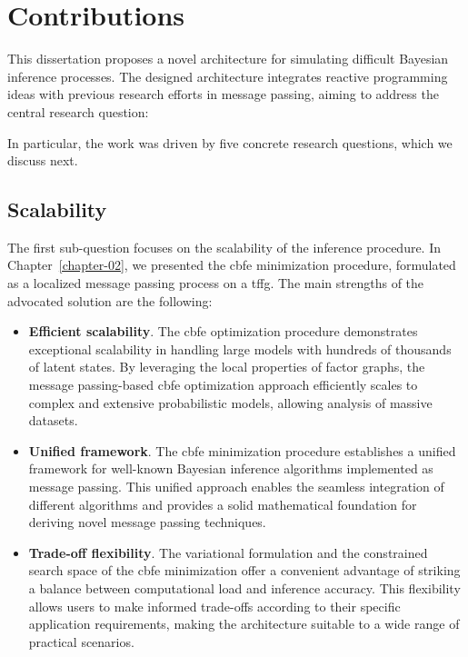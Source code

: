 \section{Contributions}\label{chapter-06:section:contributions}

This dissertation proposes a novel architecture for simulating difficult Bayesian inference processes.
The designed architecture integrates reactive programming ideas with previous research efforts
in message passing, aiming to address the central research question:

\begin{rqbox}
  \mainquestion
\end{rqbox}

In particular, the work was driven by five concrete research questions, which we discuss next.

\subsection{Scalability}

\begin{questions}
  \item \scalabilityquestion \label{question:contributions:scalability}
\end{questions}

The first sub-question focuses on the scalability of the inference procedure.
In Chapter~\ref{chapter-02}, we presented the \ac{cbfe} minimization procedure, formulated as a localized message passing process on a \ac{tffg}. The main strengths of the advocated solution are the following:
\begin{itemize}
  \item \textbf{Efficient scalability}. The \ac{cbfe} optimization procedure demonstrates exceptional scalability in handling 
        large models with hundreds of thousands of latent states.
        By leveraging the local properties of factor graphs, the message passing-based \ac{cbfe}
        optimization approach efficiently scales to complex and extensive probabilistic models,
        allowing analysis of massive datasets.
  \item \textbf{Unified framework}.
        The \ac{cbfe} minimization procedure establishes a unified framework for well-known Bayesian inference
        algorithms implemented as message passing. 
        This unified approach enables the seamless integration of different algorithms and provides a
        solid mathematical foundation for deriving novel message passing techniques.
  \item \textbf{Trade-off flexibility}.
        The variational formulation and the constrained search space of the \ac{cbfe} minimization offer a
        convenient advantage of striking a balance between computational load and inference
        accuracy. 
        This flexibility allows users to make informed trade-offs according to their specific
        application requirements, making the architecture suitable to a wide range of practical scenarios.
\end{itemize}

